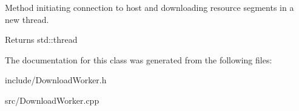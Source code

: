 Method initiating connection to host and downloading resource segments in a new thread. 

\begin{DoxyReturn}{Returns}
std\+::thread 
\end{DoxyReturn}


The documentation for this class was generated from the following files\+:\begin{DoxyCompactItemize}
\item 
include/Download\+Worker.\+h\item 
src/Download\+Worker.\+cpp\end{DoxyCompactItemize}
